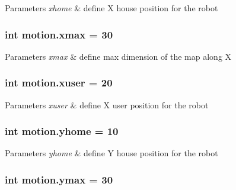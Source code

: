 \begin{DoxyParams}{Parameters}
{\em xhome} & define X house position for the robot \\
\hline
\end{DoxyParams}
\subsubsection[{\texorpdfstring{xmax}{xmax}}]{\setlength{\rightskip}{0pt plus 5cm}int motion.\+xmax = 30}\hypertarget{namespacemotion_ad15e7b7b1c76162401252ee7533515a4}{}\label{namespacemotion_ad15e7b7b1c76162401252ee7533515a4}

\begin{DoxyParams}{Parameters}
{\em xmax} & define max dimension of the map along X \\
\hline
\end{DoxyParams}
\subsubsection[{\texorpdfstring{xuser}{xuser}}]{\setlength{\rightskip}{0pt plus 5cm}int motion.\+xuser = 20}\hypertarget{namespacemotion_ac1191b288873954280855513ee9ed701}{}\label{namespacemotion_ac1191b288873954280855513ee9ed701}

\begin{DoxyParams}{Parameters}
{\em xuser} & define X user position for the robot \\
\hline
\end{DoxyParams}
\subsubsection[{\texorpdfstring{yhome}{yhome}}]{\setlength{\rightskip}{0pt plus 5cm}int motion.\+yhome = 10}\hypertarget{namespacemotion_ad24c81915bdf6ae465698c9f63e0c419}{}\label{namespacemotion_ad24c81915bdf6ae465698c9f63e0c419}

\begin{DoxyParams}{Parameters}
{\em yhome} & define Y house position for the robot \\
\hline
\end{DoxyParams}
\subsubsection[{\texorpdfstring{ymax}{ymax}}]{\setlength{\rightskip}{0pt plus 5cm}int motion.\+ymax = 30}\hypertarget{namespacemotion_a93496959e7cd7b64c958600e13052b02}{}\label{namespacemotion_a93496959e7cd7b64c958600e13052b02}

